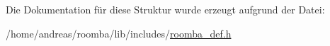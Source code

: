 Die Dokumentation für diese Struktur wurde erzeugt aufgrund der Datei\-:\begin{DoxyCompactItemize}
\item 
/home/andreas/roomba/lib/includes/\hyperlink{roomba__def_8h}{roomba\-\_\-def.\-h}\end{DoxyCompactItemize}
